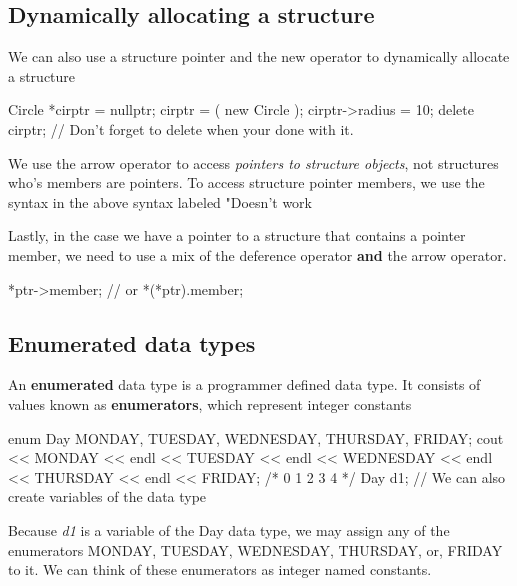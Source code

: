\documentclass{report}
\begin{document}
	\bigbreak \noindent 

	\bigbreak \noindent 
	\subsection{Dynamically allocating a structure}
	\bigbreak \noindent 
	We can also use a structure pointer and the new operator to dynamically allocate a structure
	\bigbreak \noindent 
	
	\begin{cppcode}
Circle *cirptr = nullptr;
cirptr = ( new Circle );
cirptr->radius = 10;
delete cirptr; // Don't forget to delete when your done with it.
	\end{cppcode}
	
	\bigbreak \noindent 
	\begin{notebox}
	    We use the arrow operator to access \textit{pointers to structure objects}, not structures who's members are pointers. To access structure pointer members, we use the syntax in the above syntax labeled "Doesn't work
	\end{notebox}
	
	\bigbreak \noindent 
	Lastly, in the case we have a pointer to a structure that contains a pointer member, we need to use a mix of the deference operator \textbf{and} the arrow operator. 
	\bigbreak \noindent 
	
	\begin{cppcode}
*ptr->member;
// or
*(*ptr).member;
	\end{cppcode}
	

	\pagebreak
	\subsection{Enumerated data types}
	\bigbreak \noindent 
	\begin{concept}
	   An \textbf{enumerated} data type is a programmer defined data type. It consists of values known as \textbf{enumerators}, which represent integer constants 
	\end{concept}
	\bigbreak \noindent 
	
	\begin{cppcode}
enum Day { MONDAY, TUESDAY, WEDNESDAY, THURSDAY, FRIDAY};
cout << MONDAY << endl 
    << TUESDAY << endl 
    << WEDNESDAY << endl 
    << THURSDAY << endl 
    << FRIDAY;
/*
0
1
2
3
4
*/
Day d1; //	We can also create variables of the data type
	\end{cppcode}
	
	\bigbreak \noindent 
    Because \textit{d1} is a variable of the Day data type, we may assign any of the enumerators MONDAY, TUESDAY, WEDNESDAY, THURSDAY, or, FRIDAY to it.
    \bigbreak \noindent 
    We can think of these enumerators as integer named constants.
\end{document}
